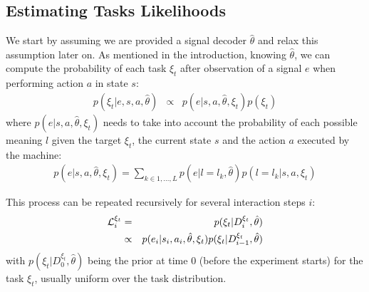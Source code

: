 



\subsection{Estimating Tasks Likelihoods}


We start by assuming we are provided a signal decoder $\hat{\theta}$ and relax this assumption later on.
%
As mentioned in the introduction, knowing $\hat{\theta}$, we can compute the probability of each task $\xi_t$ after observation of a signal $e$ when performing action $a$ in state $s$:
%
\begin{eqnarray}
p(\xi_t|e, s, a, \hat{\theta}) & \propto & p(e |s, a, \hat{\theta}, \xi_t) p(\xi_t)
\label{eq:1}
\end{eqnarray}
%
where  $p(e |s, a, \hat{\theta}, \xi_t)$ needs to take into account the probability of each possible meaning $l$ given the target $\xi_t$, the current state $s$ and the action $a$ executed by the machine:
%
\begin{eqnarray}
p(e |s, a, \hat{\theta}, \xi_t) =  \sum_{k \in {1, \ldots, L}} p(e |l = l_k, \hat{\theta}) p(l = l_k| s, a, \xi_t)
\end{eqnarray}

This process can be repeated recursively for several interaction steps $i$:
%
\begin{eqnarray}
\mathcal{L}_i^{\xi_t} & = & p(\xi_t|D_i^{\xi_t}, \hat{\theta}) \nonumber \\
& \propto & p(e_i |s_i, a_i, \hat{\theta},\xi_t) p(\xi_t|D_{i-1}^{\xi_t}, \hat{\theta})
\label{eq:filter}
\end{eqnarray}
%
with $p(\xi_t|D_0^{\xi_t}, \hat{\theta})$ being the prior at time 0 (before the experiment starts) for the task $\xi_t$, usually uniform over the task distribution. 

